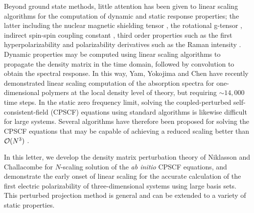 \documentclass[prl,aps,preprint,showpacs,superbib]{revtex4}
\begin{document}
Beyond ground state methods, little attention has been given 
to linear scaling algorithms for the computation of dynamic and static response 
properties; the latter including the nuclear magnetic shielding tensor \cite{Pulay_1990}, 
the rotational g-tensor \cite{Helgaker_1996}, indirect spin-spin coupling constant 
\cite{SpinSpin},
third order  properties such as the first hyperpolarizability 
\cite{Franky_1997} and polarizability derivatives such as the Raman intensity 
\cite{Raman}
.  
Dynamic  properties may be computed using linear scaling algorithms to propagate the density matrix 
\cite{SNomura97,CYam03} in 
the time domain, followed by convolution to obtain the spectral response.  In this way, 
Yam, Yokojima and Chen \cite{CYam03} have recently demonstrated linear scaling 
computation of the absorption spectra for one-dimensional polymers at the local 
density level of theory, but requiring $\sim 14,000$ time steps.  In the static zero frequency limit, 
solving the coupled-perturbed self-consistent-field (CPSCF) equations using standard algorithms is likewise difficult for
large systems.
Several algorithms have therefore been proposed for solving the CPSCF equations 
that may be capable of achieving a reduced scaling better than ${\cal O}(N^3)$ 
\cite{COchsenfeld97,HLarsen01a}.  

In this letter, we develop the density matrix perturbation theory of Niklasson and Challacombe 
\cite{ANiklasson04} for $N$-scaling solution of the {\em ab initio} CPSCF equations, and 
demonstrate the early onset of linear scaling for the accurate calculation of the first electric 
polarizability of three-dimensional systems using large basis sets. This perturbed projection 
method is general and can be extended to a variety of static properties.
\end{document}
